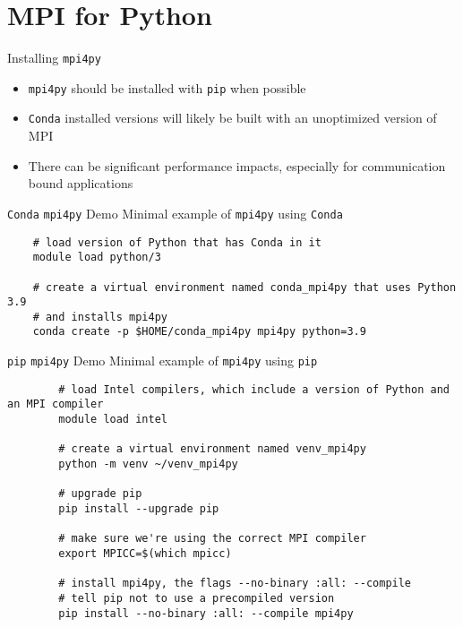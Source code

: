 \section{MPI for Python}

\begin{frame}{Installing  \texttt{mpi4py}}
\begin{itemize}
\item  \texttt{mpi4py} should be installed with \texttt{pip} when possible
\item \texttt{Conda} installed versions will likely be built with an unoptimized version of MPI
\item There can be significant performance impacts, especially for communication bound applications
\end{itemize}
\end{frame}

\begin{frame}[fragile]{\texttt{Conda} \texttt{mpi4py} Demo}
	Minimal example of  \texttt{mpi4py} using \texttt{Conda}
\begin{verbatim}
	# load version of Python that has Conda in it
	module load python/3
	
	# create a virtual environment named conda_mpi4py that uses Python 3.9 
	# and installs mpi4py
	conda create -p $HOME/conda_mpi4py mpi4py python=3.9 
\end{verbatim}
\end{frame}

\begin{frame}[fragile]{\texttt{pip} \texttt{mpi4py} Demo}
	Minimal example of  \texttt{mpi4py} using \texttt{pip}
	\begin{verbatim}
		# load Intel compilers, which include a version of Python and an MPI compiler
		module load intel
		
		# create a virtual environment named venv_mpi4py
		python -m venv ~/venv_mpi4py
		
		# upgrade pip
		pip install --upgrade pip
		
		# make sure we're using the correct MPI compiler
		export MPICC=$(which mpicc)
		
		# install mpi4py, the flags --no-binary :all: --compile 
		# tell pip not to use a precompiled version
		pip install --no-binary :all: --compile mpi4py
	\end{verbatim}
\end{frame}

